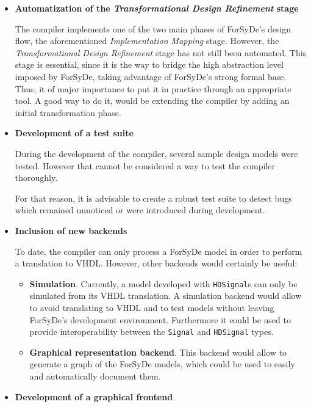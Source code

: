 \begin{itemize}
\item \textbf{Automatization of the \textit{Transformational Design
      Refinement} stage} 

  The compiler implements one of the two main phases of ForSyDe's
  design flow, the aforementioned \textit{Implementation Mapping}
  stage.  However, the \textit{Transformational Design Refinement}
  stage has not still been automated. This stage is essential, since
  it is the way to bridge the high abstraction level imposed by
  ForSyDe, taking advantage of ForSyDe's strong formal base. Thus, it
  of major importance to put it in practice through an appropriate
  tool.  A good way to do it, would be extending the compiler by
  adding an initial transformation phase.
  
\item \textbf{Development of a test suite}
  
  During the development of the compiler, several sample design models
  were tested. However that cannot be considered a way to test the
  compiler thoroughly.
  
  For that reason, it is advisable to create a robust test suite to
  detect bugs which remained unnoticed or were introduced during
  development.
  
\item \textbf{Inclusion of new backends}

  To date, the compiler can only process a ForSyDe model in order to perform a
  translation to VHDL. However, other backends would certainly be useful:
  \begin{itemize}
  \item \textbf{Simulation}. Currently, a model developed with
    \texttt{HDSignal}s can only be simulated from its VHDL
    translation. A simulation backend would allow to avoid translating
    to VHDL and to test models without leaving ForSyDe's development
    environment. Furthermore it could be used to provide
    interoperability between the \texttt{Signal} and \texttt{HDSignal}
    types.
  \item \textbf{Graphical representation backend}. This backend would
    allow to generate a graph of the ForSyDe models, which could be
    used to easily and automatically document them.
  
  \end{itemize}
  

\item \textbf{Development of a graphical frontend} 


\end{itemize}
